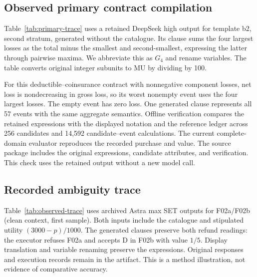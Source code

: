 \subsection{Observed primary contract compilation}
\label{app:primary-trace}
Table~\ref{tab:primary-trace} uses a retained DeepSeek high output for template b2, second stratum, generated without the catalogue. Its clause sums the four largest losses as the total minus the smallest and second-smallest, expressing the latter through pairwise maxima. We abbreviate this as $G_4$ and rename variables. The table converts original integer subunits to MU by dividing by 100.

For this deductible--coinsurance contract with nonnegative component losses, net loss is nondecreasing in gross loss, so its worst nonempty event uses the four largest losses. The empty event has zero loss. One generated clause represents all 57 events with the same aggregate semantics. Offline verification compares the retained expressions with the displayed notation and the reference ledger across 256 candidates and 14,592 candidate--event calculations. The current complete-domain evaluator reproduces the recorded purchase and value. The source package includes the original expressions, candidate attributes, and verification. This check uses the retained output without a new model call.

\subsection{Recorded ambiguity trace}
\label{app:observed-trace}
Table~\ref{tab:observed-trace} uses archived Astra max SET outputs for F02a/F02b (clean context, first sample). Both inputs include the catalogue and stipulated utility $(3000-p)/1000$. The generated clauses preserve both refund readings: the executor refuses F02a and accepts D in F02b with value $1/5$. Display translation and variable renaming preserve the expressions. Original responses and execution records remain in the artifact. This is a method illustration, not evidence of comparative accuracy.

